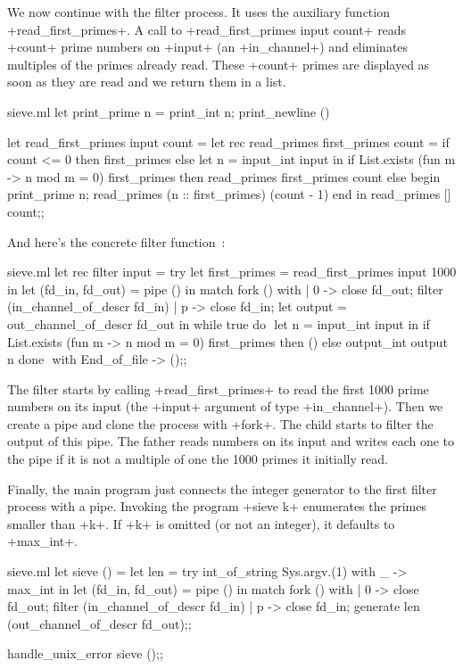 We now continue with the filter process. It uses the auxiliary function
\ml+read_first_primes+. A call to \ml+read_first_primes input count+ 
reads \ml+count+ prime numbers on \ml+input+ (an \ml+in_channel+) and eliminates
multiples of the primes already read. These \ml+count+ primes are
displayed as soon as they are read and we return them in a list.
%
\begin{listingcodefile}[style=numbers]{sieve.ml}
let print_prime n = print_int n; print_newline ()

let read_first_primes input count =
  let rec read_primes first_primes count =
    if count <= 0 then first_primes else
    let n = input_int input in
    if List.exists (fun m -> n mod m = 0) first_primes then
      read_primes first_primes count
    else begin
      print_prime n;
      read_primes (n :: first_primes) (count - 1)
    end 
  in
  read_primes [] count$\label{prog:pprime}$;;
\end{listingcodefile}
%
And here's the concrete filter function~:  
%
\begin{listingcodefile}[style=numbers]{sieve.ml}
let rec filter input =
  try 
    let first_primes = read_first_primes input 1000 in
    let (fd_in, fd_out) = pipe () in
    match fork () with
    | 0 ->
        close fd_out;
        filter (in_channel_of_descr fd_in)
    | p ->
        close fd_in;
        let output = out_channel_of_descr fd_out in
        while true do $\label{prog:sievewhile}$
          let n = input_int input in
          if List.exists (fun m -> n mod m = 0) first_primes then ()
          else output_int output n
        done $\label{prog:sievedone}$
  with End_of_file -> ();;
\end{listingcodefile}
%
The filter starts by calling \ml+read_first_primes+ to read the first
1000 prime numbers on its input (the \ml+input+ argument of type
\ml+in_channel+). Then we create a pipe and clone the process with
\ml+fork+. The child starts to filter the output of this pipe.  The
father reads numbers on its input and writes each one to the pipe if it
is not a multiple of one the 1000 primes it initially read.

Finally, the main program just connects the integer generator to the
first filter process with a pipe. Invoking the program \ml+sieve k+
enumerates the primes smaller than \ml+k+. If \ml+k+ is omitted (or
not an integer), it defaults to \ml+max_int+.
%
\begin{listingcodefile}[style=numbers]{sieve.ml}
let sieve () =
  let len = try int_of_string Sys.argv.(1) with _ -> max_int in
  let (fd_in, fd_out) = pipe () in
  match fork () with
  | 0 ->
      close fd_out;
      filter (in_channel_of_descr fd_in)
  | p ->
      close fd_in;
      generate len (out_channel_of_descr fd_out);; $\label{prog:gen}$

handle_unix_error sieve ();;
\end{listingcodefile}
%

